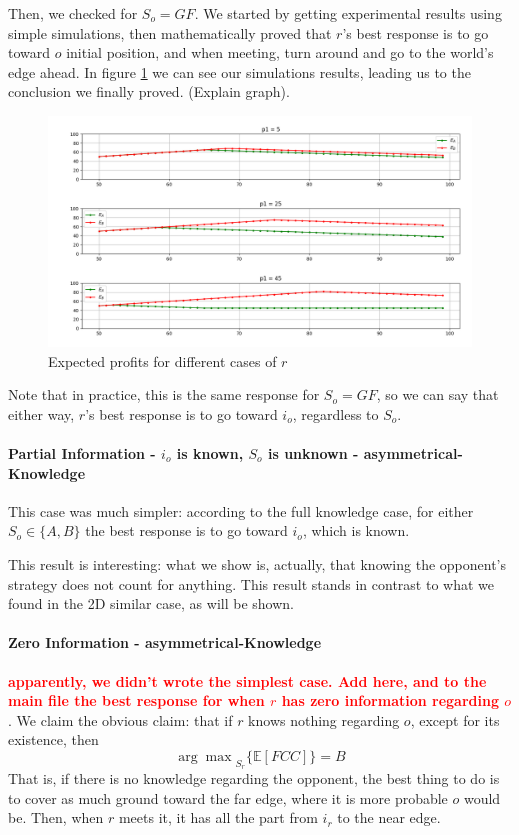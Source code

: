 \documentclass[a4paper,english,10pt]{article}
\newcommand\rob{\ensuremath{r}\xspace}
\newcommand\opp{\ensuremath{o}\xspace}
\newcommand{\fcc}{\ensuremath{FCC}\xspace}
\newcommand{\gf}{\ensuremath{GF}\xspace}
\begin{document}
Then, we checked for $S_\opp = \gf$. We started by getting experimental results using simple simulations, then mathematically proved that \rob's best response is to go toward \opp initial position, and when meeting, turn around and go to the world's edge ahead.
In figure \ref{figures:1D,partial,FullInfo,B case} we can see our simulations results, leading us to the conclusion we finally proved. (Explain graph).
\begin{figure}[H]
\includegraphics[width=\textwidth]{Images/GainedProfitp2SecondHalfWorld.png}
\caption{Expected profits for different cases of $r$}
\label{figures:1D,partial,FullInfo,B case}
\end{figure}

Note that in practice, this is the same response for $S_\opp = \gf$, so we can say that either way, \rob's best response is to go toward $i_\opp$, regardless to $S_\opp$.

\paragraph{Partial Information - $i_\opp$ is known, $S_\opp$ is unknown - asymmetrical-Knowledge}
This case was much simpler: according to the full knowledge case, for either $S_\opp \in \lbrace A,B \rbrace$ the best response is to go toward $i_\opp$, which is known.

This result is interesting: what we show is, actually, that knowing the opponent's strategy does not count for anything. This result stands in contrast to what we found in the 2D similar case, as will be shown.

\paragraph{Zero Information - asymmetrical-Knowledge}
\textcolor{red}{\textbf{apparently, we didn't wrote the simplest case. Add here, and to the main file the best response for when \rob has zero information regarding \opp}}.
We claim the obvious claim: that if \rob knows nothing regarding \opp, except for its existence, then \[{\arg \max}_{S_\rob}\lbrace\mathbb{E}[\fcc]\rbrace=B\]
That is, if there is no knowledge regarding the opponent, the best thing to do is to cover as much ground toward the far edge, where it is more probable \opp would be. Then, when \rob meets it, it has all the part from $i_\rob$ to the near edge.
\end{document}
